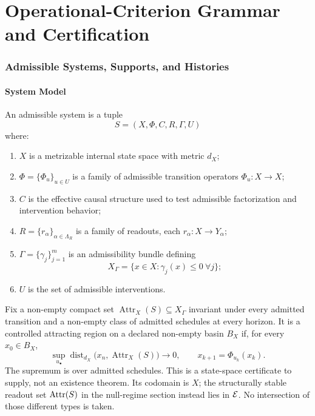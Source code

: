 \part{Operational-Criterion Grammar and Certification}
\section{Admissible Systems, Supports, and Histories}

\subsection{System Model}

\begin{definition}\label{def:system}
An admissible system is a tuple
\[
S=(X,\Phi,C,R,\Gamma,U)
\]
where:
\begin{enumerate}[leftmargin=1.5em]
\item $X$ is a metrizable internal state space with metric $d_X$;
\item $\Phi=\{\Phi_u\}_{u\in U}$ is a family of admissible transition operators $\Phi_u:X\to X$;
\item $C$ is the effective causal structure used to test admissible factorization and intervention behavior;
\item $R=\{r_\alpha\}_{\alpha\in\Lambda_R}$ is a family of readouts, each $r_\alpha:X\to Y_\alpha$;
\item $\Gamma=\{\gamma_j\}_{j=1}^m$ is an admissibility bundle defining
\[
X_\Gamma=\{x\in X:\gamma_j(x)\le 0\ \forall j\};
\]
\item $U$ is the set of admissible interventions.
\end{enumerate}
\end{definition}

\begin{definition}\label{def:state-attractor}
Fix a non-empty compact set $\operatorname{Attr}_X(S)\subseteq X_\Gamma$ invariant under every admitted transition and a non-empty class of admitted schedules at every horizon. It is a controlled attracting region on a declared non-empty basin $B_X$ if, for every $x_0\in B_X$,
\[
\sup_{u_\bullet}\operatorname{dist}_{d_X}\bigl(x_n,\operatorname{Attr}_X(S)\bigr)\longrightarrow0,
\qquad x_{k+1}=\Phi_{u_k}(x_k).
\]
The supremum is over admitted schedules. This is a state-space certificate to supply, not an existence theorem. Its codomain is $X$; the structurally stable readout set $\operatorname{Attr}(S)$ in the null-regime section instead lies in $\mathcal{E}$. No intersection of those different types is taken.
\end{definition}

